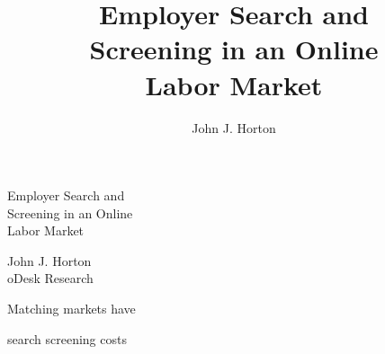 \documentclass[12pt]{beamer}
\title[Employer Search and Screening in an Online Labor Market]{Employer Search and\\Screening in an Online\\Labor Market}
\author{John J. Horton}
\institute{oDesk Research}
\begin{document}
\setlength{\baselineskip}{12mm}
\fontsize{10mm}{12mm}\selectfont

\begin{frame}
\begin{center}
Employer Search and\\
Screening in an Online\\
Labor Market

\vspace{3mm}

\Large
John J. Horton\\
oDesk Research
\end{center}
\end{frame}

\begin{frame}{}
\begin{center}
Matching markets have

search screening costs
\end{center}
\end{frame}
\end{document}
